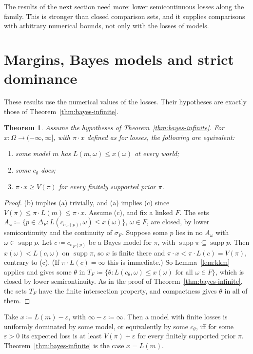 \documentclass[11pt]{article}
\newtheorem{theorem}{Theorem}[section]
\theoremstyle{definition}
\theoremstyle{remark}
\newcommand{\supp}{\operatorname{supp}}
\begin{document}
The results of the next section need more: lower semicontinuous losses along the family. This is stronger than closed comparison sets, and it supplies comparisons with arbitrary numerical bounds, not only with the losses of models.

\section{Margins, Bayes models and strict dominance}\label{sec:margins}
These results use the numerical values of the losses. Their hypotheses are exactly those of Theorem~\ref{thm:bayes-infinite}.

\begin{theorem}\label{thm:margin}
Assume the hypotheses of Theorem~\ref{thm:bayes-infinite}. For $x:\Omega\to(-\infty,\infty]$, with $\pi\cdot x$ defined as for losses, the following are equivalent:
\begin{enumerate}[label=(\alph*)]
\item some model $m$ has $L(m,\omega)\le x(\omega)$ at every world;
\item some $c_\theta$ does;
\item $\pi\cdot x\ge V(\pi)$ for every finitely supported prior $\pi$.
\end{enumerate}
\end{theorem}
\begin{proof}
(b) implies (a) trivially, and (a) implies (c) since $V(\pi)\le\pi\cdot L(m)\le\pi\cdot x$. Assume (c), and fix a linked $F$. The sets $A_\omega\coloneqq\{p\in\Delta_F:L(c_{\sigma_F(p)},\omega)\le x(\omega)\}$, $\omega\in F$, are closed, by lower semicontinuity and the continuity of $\sigma_F$. Suppose some $p$ lies in no $A_\omega$ with $\omega\in\supp p$. Let $c\coloneqq c_{\sigma_F(p)}$ be a Bayes model for $\pi$, with $\supp\pi\subseteq\supp p$. Then $x(\omega)<L(c,\omega)$ on $\supp\pi$, so $x$ is finite there and $\pi\cdot x<\pi\cdot L(c)=V(\pi)$, contrary to (c). (If $\pi\cdot L(c)=\infty$ this is immediate.) So Lemma~\ref{lem:kkm} applies and gives some $\theta$ in $T_F\coloneqq\{\theta:L(c_\theta,\omega)\le x(\omega)\text{ for all }\omega\in F\}$, which is closed by lower semicontinuity. As in the proof of Theorem~\ref{thm:bayes-infinite}, the sets $T_F$ have the finite intersection property, and compactness gives $\theta$ in all of them.
\end{proof}

Take $x\coloneqq L(m)-\varepsilon$, with $\infty-\varepsilon\coloneqq\infty$. Then a model with finite losses is uniformly dominated by some model, or equivalently by some $c_\theta$, iff for some $\varepsilon>0$ its expected loss is at least $V(\pi)+\varepsilon$ for every finitely supported prior $\pi$. Theorem~\ref{thm:bayes-infinite} is the case $x=L(m)$.
\end{document}
